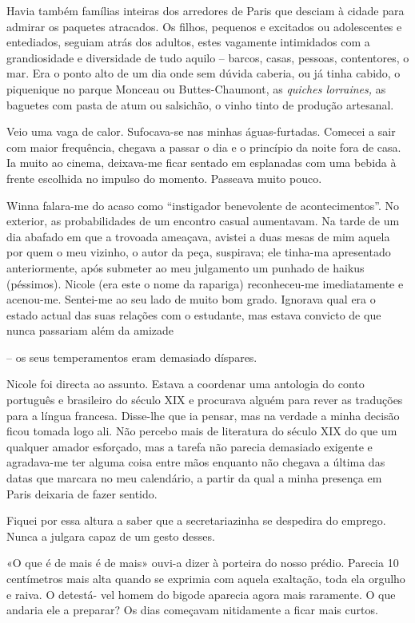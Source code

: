 Havia também famílias inteiras dos arredores de Paris que desciam à
cidade para admirar os paquetes atracados. Os filhos, pequenos e
excitados ou adolescentes e entediados, seguiam atrás dos adultos, estes
vagamente intimidados com a grandiosidade e diversidade de tudo aquilo
-- barcos, casas, pessoas, contentores, o mar. Era o ponto alto de um
dia onde sem dúvida caberia, ou já tinha cabido, o piquenique no parque
Monceau ou Buttes-Chaumont, as \emph{quiches lorraines, }as baguetes com
pasta de atum ou salsichão, o vinho tinto de produção artesanal.

Veio uma vaga de calor. Sufocava-se nas minhas águas-furtadas. Comecei a sair com maior frequência, chegava a passar o dia e
o princípio da noite fora de casa. Ia muito ao cinema, deixava-me ficar
sentado em esplanadas com uma bebida à frente escolhida no impulso do
momento. Passeava muito pouco.

Winna falara-me do acaso como ``instigador benevolente de
acontecimentos''. No exterior, as probabilidades de um encontro casual
aumentavam. Na tarde de um dia abafado em que a trovoada ameaçava,
avistei a duas mesas de mim
aquela por quem o meu vizinho, o autor da peça, suspirava; ele tinha-ma
apresentado anteriormente, após submeter ao meu julgamento um punhado de
haikus (péssimos). Nicole (era este o nome da rapariga) reconheceu-me
imediatamente e acenou-me. Sentei-me ao seu lado de muito bom grado.
Ignorava qual era o estado actual das suas relações com o estudante, mas
estava convicto de que nunca passariam além da amizade

-- os seus temperamentos eram demasiado díspares.

Nicole foi directa ao assunto. Estava a coordenar uma antologia do conto
português e brasileiro do século XIX e procurava alguém para rever as
traduções para a língua francesa. Disse-lhe que ia pensar, mas na
verdade a minha decisão ficou tomada logo ali. Não percebo mais de
literatura do século XIX do que um qualquer amador esforçado, mas a
tarefa não parecia demasiado exigente e agradava-me ter alguma coisa
entre mãos enquanto não chegava a última das datas que marcara no meu
calendário, a partir da qual a minha presença em Paris deixaria de fazer
sentido.

Fiquei por essa altura a saber que a secretariazinha se despedira do
emprego. Nunca a julgara capaz de um gesto desses.

«O que é de mais é de mais» ouvi-a dizer à porteira do nosso prédio.
Parecia 10 centímetros mais alta quando se exprimia com aquela
exaltação, toda ela orgulho e raiva. O detestá- vel homem do bigode
aparecia agora mais raramente. O que andaria ele a preparar? Os dias
começavam nitidamente a ficar mais curtos.


